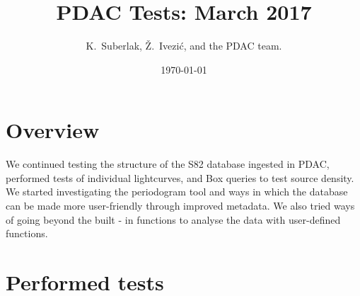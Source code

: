 \documentclass[DM,lsstdraft,toc,usenatbib]{lsstdoc}
\title[PDAC progress]{PDAC Tests: March 2017}
\author{
K.~Suberlak,
\v{Z}.~Ivezi\'c,
and the PDAC team.}
\date{\today}
\begin{document}
\maketitle

\section{Overview}

We continued testing the structure of the S82 database ingested in PDAC,  performed tests of individual lightcurves, and Box queries to test source density. We started investigating the periodogram tool and ways in which the database can be made more user-friendly through improved  metadata.  We also tried ways of going beyond the built - in functions to analyse the data with user-defined functions. 



\section{Performed tests}
\end{document}
